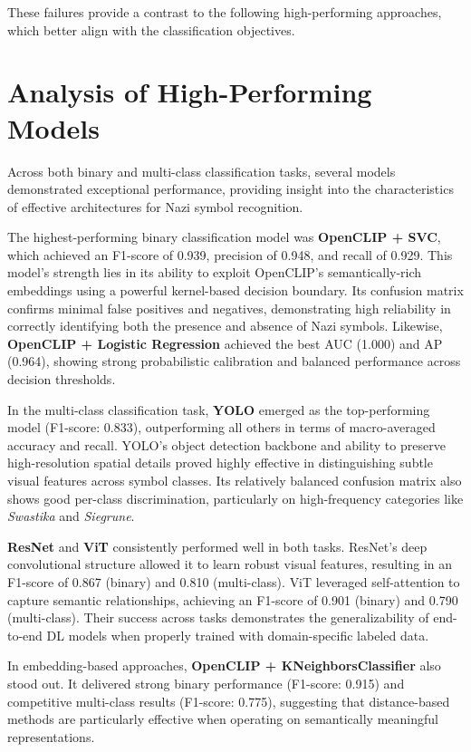 These failures provide a contrast to the following high-performing approaches, which better align with the
classification objectives.

\section{Analysis of High-Performing Models}

Across both binary and multi-class classification tasks, several models demonstrated exceptional performance,
providing insight into the characteristics of effective architectures for Nazi symbol recognition.

The highest-performing binary classification model was \textbf{OpenCLIP + \ac{SVC}}, which achieved an F1-score of
0.939, precision of 0.948, and recall of 0.929. This model’s strength lies in its ability to exploit OpenCLIP’s
semantically-rich embeddings using a powerful kernel-based decision boundary. Its confusion matrix confirms minimal
false positives and negatives, demonstrating high reliability in correctly identifying both the presence and absence
of Nazi symbols. Likewise, \textbf{OpenCLIP + Logistic Regression} achieved the best AUC (1.000) and AP (0.964),
showing strong probabilistic calibration and balanced performance across decision thresholds.

In the multi-class classification task, \textbf{\ac{YOLO}} emerged as the top-performing model (F1-score: 0.833),
outperforming all others in terms of macro-averaged accuracy and recall. YOLO’s object detection backbone and
ability to preserve high-resolution spatial details proved highly effective in distinguishing subtle visual features
across symbol classes. Its relatively balanced confusion matrix also shows good per-class discrimination,
particularly on high-frequency categories like \textit{Swastika} and \textit{Siegrune}.

\textbf{\ac{ResNet}} and \textbf{\ac{ViT}} consistently performed well in both tasks. \ac{ResNet}’s deep
convolutional structure allowed it to learn robust visual features, resulting in an F1-score of 0.867 (binary) and
0.810 (multi-class). \ac{ViT} leveraged self-attention to capture semantic relationships, achieving an F1-score of
0.901 (binary) and 0.790 (multi-class). Their success across tasks demonstrates the generalizability of end-to-end
\ac{DL} models when properly trained with domain-specific labeled data.

In embedding-based approaches, \textbf{OpenCLIP + KNeighborsClassifier} also stood out. It delivered strong binary
performance (F1-score: 0.915) and competitive multi-class results (F1-score: 0.775), suggesting that distance-based
methods are particularly effective when operating on semantically meaningful representations.

